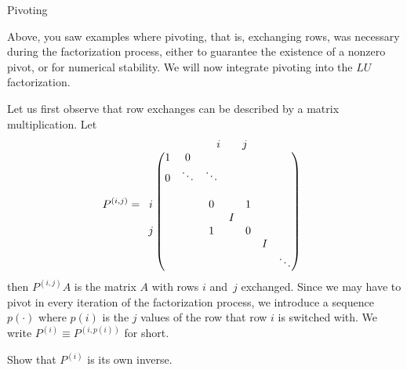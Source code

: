  {Pivoting}
\label{sec:pivoting}

Above, you saw examples where pivoting, that is, exchanging rows, was
necessary during the factorization process, either to guarantee the
existence of a nonzero pivot, or for numerical stability. We will now
integrate pivoting into the $LU$ factorization.

Let us first observe that row exchanges can be described by a matrix
multiplication. Let
\[ P^{(i,j)}=
\begin{array}{cc}
\begin{matrix}\hphantom{i}\end{matrix}
\begin{matrix}&&i&&j&\end{matrix}
\\
\begin{matrix}
  \\ \\ i \\ \\ j\\ \\
\end{matrix}
\begin{pmatrix}
  1&0\\ 0&\ddots&\ddots\\ &\\
  &&0&&1\\ &&&I\\ &&1&&0\\ &&&&&I\\ &&&&&&\ddots
\end{pmatrix}
\end{array}
\]
then $P^{(i,j)}A$ is the matrix $A$ with rows $i$ and~$j$
exchanged. Since we may have to pivot in every iteration of the
factorization process, we introduce a sequence $p(\cdot)$ where $p(i)$
is the $j$ values of the row that row $i$ is switched with. We write
$P^{(i)}\equiv P^{(i,p(i))}$ for short.
\begin{exercise}
  Show that $P^{(i)}$ is its own inverse.
\end{exercise}

